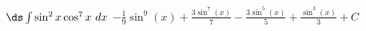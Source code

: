 {$\ds \int \sin^2 x\cos^7 x\ dx$}
{$-\frac{1}{9} \sin ^{9}(x)+\frac{3 \sin
   ^7(x)}{7}-\frac{3\sin ^5(x)}{5}+\frac{\sin ^3(x)}{3}+ C$}
